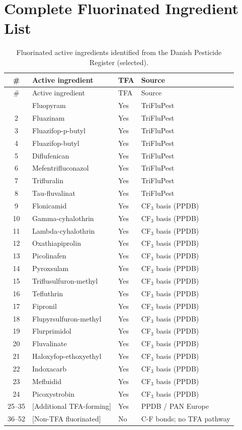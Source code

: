 \documentclass[12pt,a4paper]{article}
\begin{document}
\section{Complete Fluorinated Ingredient List}

\footnotesize
\begin{longtable}{@{}clll@{}}
\caption{Fluorinated active ingredients identified from the Danish Pesticide Register (selected).} \\
\toprule
\# & Active ingredient & TFA & Source \\
\midrule
\endfirsthead
\toprule
\# & Active ingredient & TFA & Source \\
\midrule
\endhead
\bottomrule
\endfoot
1 & Fluopyram & Yes & TriFluPest \\
2 & Fluazinam & Yes & TriFluPest \\
3 & Fluazifop-p-butyl & Yes & TriFluPest \\
4 & Fluazifop-butyl & Yes & TriFluPest \\
5 & Diflufenican & Yes & TriFluPest \\
6 & Mefentrifluconazol & Yes & TriFluPest \\
7 & Trifluralin & Yes & TriFluPest \\
8 & Tau-fluvalinat & Yes & TriFluPest \\
9 & Flonicamid & Yes & CF$_3$ basis (PPDB) \\
10 & Gamma-cyhalothrin & Yes & CF$_3$ basis (PPDB) \\
11 & Lambda-cyhalothrin & Yes & CF$_3$ basis (PPDB) \\
12 & Oxathiapiprolin & Yes & CF$_3$ basis (PPDB) \\
13 & Picolinafen & Yes & CF$_3$ basis (PPDB) \\
14 & Pyroxsulam & Yes & CF$_3$ basis (PPDB) \\
15 & Triflusulfuron-methyl & Yes & CF$_3$ basis (PPDB) \\
16 & Tefluthrin & Yes & CF$_3$ basis (PPDB) \\
17 & Fipronil & Yes & CF$_3$ basis (PPDB) \\
18 & Flupyrsulfuron-methyl & Yes & CF$_3$ basis (PPDB) \\
19 & Flurprimidol & Yes & CF$_3$ basis (PPDB) \\
20 & Fluvalinate & Yes & CF$_3$ basis (PPDB) \\
21 & Haloxyfop-ethoxyethyl & Yes & CF$_3$ basis (PPDB) \\
22 & Indoxacarb & Yes & CF$_3$ basis (PPDB) \\
23 & Mefluidid & Yes & CF$_3$ basis (PPDB) \\
24 & Picoxystrobin & Yes & CF$_3$ basis (PPDB) \\
25--35 & [Additional TFA-forming] & Yes & PPDB / PAN Europe \\
36--52 & [Non-TFA fluorinated] & No & C-F bonds; no TFA pathway \\
\end{longtable}
\normalsize
\end{document}
